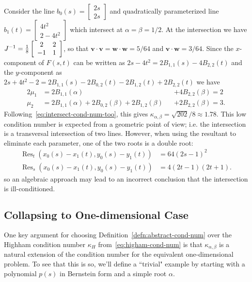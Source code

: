 \documentclass[3p, authoryear, square]{elsarticle}
\theoremstyle{definition}
\begin{document}
Consider the line
\(b_0(s) = \left[ \begin{array}{c} 2s \\ 2s \end{array}\right]\)
and quadratically parameterized line
\(b_1(t) = \left[ \begin{array}{c} 4t^2 \\ 2 - 4t^2
\end{array}\right]\) which intersect at \(\alpha = \beta = 1/2\).
At the intersection we have \(J^{-1} = \frac{1}{8}
\left[ \begin{array}{c c} 2 & 2 \\ -1 & 1 \end{array}\right]\),
so that \(\bm{v} \cdot \bm{v} = \bm{w} \cdot \bm{w} =
5/64\) and \(\bm{v} \cdot \bm{w} = 3/64\). Since the
\(x\)-component of \(F(s, t)\) can be written as
\(2s - 4t^2 = 2 B_{1, 1}(s) - 4 B_{2, 2}(t)\) and the
\(y\)-component as \(2s + 4t^2 - 2 = 2 B_{1, 1}(s) - 2 B_{0, 2}(t)
- 2 B_{1, 2}(t) + 2 B_{2, 2}(t)\) we have
\begin{alignat}{2}
\mu_1 &= 2 B_{1, 1}(\alpha) &&+ 4 B_{2, 2}(\beta) = 2 \\
\mu_2 &= 2 B_{1, 1}(\alpha) + 2 B_{0, 2}(\beta) +
  2 B_{1, 2}(\beta) &&+ 2 B_{2, 2}(\beta) = 3.
\end{alignat}
Following~\eqref{eq:intersect-cond-num-too}, this gives
\(\kappa_{\alpha, \beta} = \sqrt{202}/8 \approx 1.78\).
This low condition number is expected from a geometric point of view; i.e.
the intersection is a transversal intersection of two lines. However,
when using the resultant to eliminate each parameter, one of the two roots is
a double root:
\begin{align}
\operatorname{Res}_t\left(x_0(s) - x_1(t), y_0(s) - y_1(t)\right) &=
  64(2s - 1)^2 \\
\operatorname{Res}_s\left(x_0(s) - x_1(t), y_0(s) - y_1(t)\right) &=
  4(2t - 1)(2t + 1).
\end{align}
so an algebraic approach may lead to an incorrect conclusion that the
intersection is ill-conditioned.

\subsection{Collapsing to One-dimensional Case}

One key argument for choosing Definition~\ref{defn:abstract-cond-num} over
the Highham condition number \(\kappa_H\) from~\eqref{eq:higham-cond-num} is
that \(\kappa_{\alpha, \beta}\) is a natural extension of the condition number
for the equivalent one-dimensional problem. To see that this is so, we'll
define a ``trivial" example by starting with a polynomial \(p(s)\) in Bernstein
form and a simple root \(\alpha\).
\end{document}
